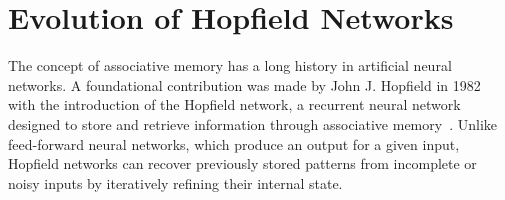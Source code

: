 \section{Evolution of Hopfield Networks}

The concept of associative memory has a long history in artificial neural networks. 
A foundational contribution was made by John J. Hopfield in 1982 with the introduction of the Hopfield network, 
a recurrent neural network designed to store and retrieve information through associative memory~\cite{hopfield1982}.
Unlike feed-forward neural networks, which produce an output for a given input, Hopfield networks can recover previously stored patterns from incomplete or noisy inputs by iteratively refining their internal state.




